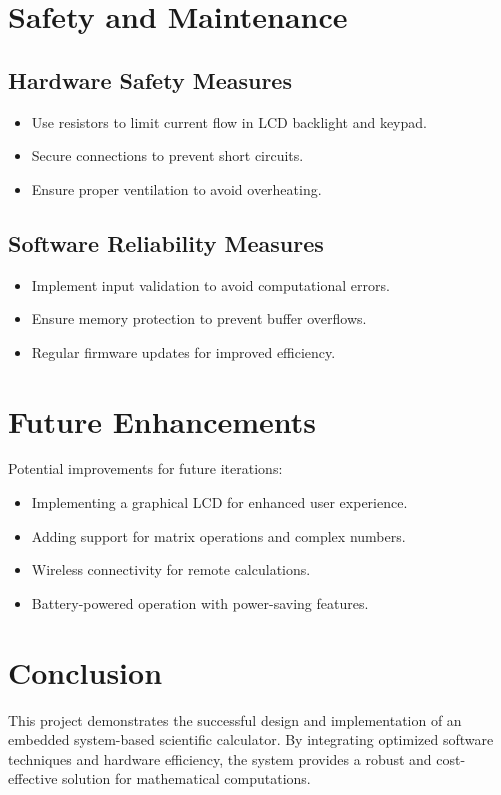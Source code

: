 \documentclass[journal]{IEEEtran}
\begin{document}
\section{Safety and Maintenance}
\subsection{Hardware Safety Measures}
\begin{itemize}
    \item Use resistors to limit current flow in LCD backlight and keypad.
    \item Secure connections to prevent short circuits.
    \item Ensure proper ventilation to avoid overheating.
\end{itemize}

\subsection{Software Reliability Measures}
\begin{itemize}
    \item Implement input validation to avoid computational errors.
    \item Ensure memory protection to prevent buffer overflows.
    \item Regular firmware updates for improved efficiency.
\end{itemize}

\section{Future Enhancements}
Potential improvements for future iterations:
\begin{itemize}
    \item Implementing a graphical LCD for enhanced user experience.
    \item Adding support for matrix operations and complex numbers.
    \item Wireless connectivity for remote calculations.
    \item Battery-powered operation with power-saving features.
\end{itemize}

\section{Conclusion}
This project demonstrates the successful design and implementation of an embedded system-based scientific calculator. By integrating optimized software techniques and hardware efficiency, the system provides a robust and cost-effective solution for mathematical computations.
\end{document}
